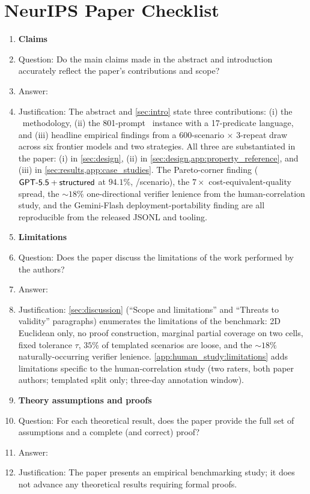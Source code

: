 \clearpage
\section*{NeurIPS Paper Checklist}

\begin{enumerate}

\item {\bf Claims}
\item[] Question: Do the main claims made in the abstract and introduction accurately reflect the paper's contributions and scope?
\item[] Answer: \answerYes{}
\item[] Justification: The abstract and \cref{sec:intro} state three contributions: (i) the \GeoGen\ methodology, (ii) the 801-prompt \GeoGenBench\ instance with a 17-predicate language, and (iii) headline empirical findings from a $600$-scenario $\times$ $3$-repeat draw across six frontier models and two strategies. All three are substantiated in the paper: (i) in \cref{sec:design}, (ii) in \cref{sec:design,app:property_reference}, and (iii) in \cref{sec:results,app:case_studies}. The Pareto-corner finding ($\textsf{GPT-5.5} + \textsf{structured}$ at $94.1$\%, /scenario), the $7\times$ cost-equivalent-quality spread, the $\sim 18\%$ one-directional verifier lenience from the human-correlation study, and the Gemini-Flash deployment-portability finding are all reproducible from the released JSONL and tooling.

\item {\bf Limitations}
\item[] Question: Does the paper discuss the limitations of the work performed by the authors?
\item[] Answer: \answerYes{}
\item[] Justification: \cref{sec:discussion} (``Scope and limitations'' and ``Threats to validity'' paragraphs) enumerates the limitations of the benchmark: 2D Euclidean only, no proof construction, marginal partial coverage on two \structured cells, fixed tolerance $\tau$, $35\%$ of templated scenarios are loose, and the $\sim 18\%$ naturally-occurring verifier lenience. \cref{app:human_study:limitations} adds limitations specific to the human-correlation study (two raters, both paper authors; templated split only; three-day annotation window).

\item {\bf Theory assumptions and proofs}
\item[] Question: For each theoretical result, does the paper provide the full set of assumptions and a complete (and correct) proof?
\item[] Answer: \answerNA{}
\item[] Justification: The paper presents an empirical benchmarking study; it does not advance any theoretical results requiring formal proofs.


\end{enumerate}
